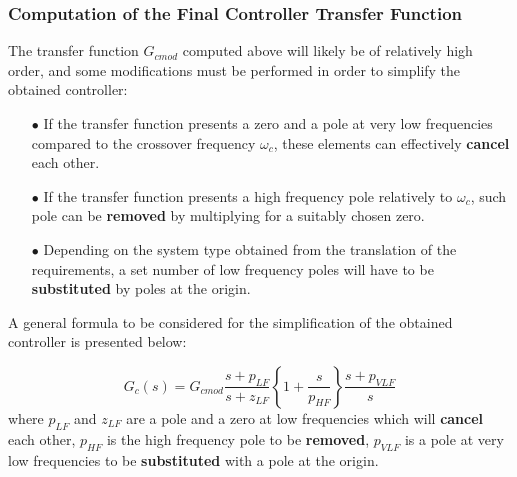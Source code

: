 \documentclass[a4paper,10pt,titlepage]{article}
\numberwithin{equation}{subsection}
\begin{document}
	\subsubsection{Computation of the Final Controller Transfer Function}
	The transfer function $G_{cmod}$ computed above will likely be of relatively high order, and some modifications must be performed in order to simplify the obtained controller:
	
	\begin{enumerate}
		\item[$\bullet$] If the transfer function presents a zero and a pole at very low frequencies compared to the crossover frequency $\omega_c$, these elements can effectively \textbf{cancel} each other.
		\item[$\bullet$] If the transfer function presents a high frequency pole relatively to $\omega_c$, such pole can be \textbf{removed} by multiplying for a suitably chosen zero.
		\item[$\bullet$] Depending on the system type obtained from the translation of the requirements, a set number of low frequency poles will have to be \textbf{substituted} by poles at the origin.
	\end{enumerate}
	A general formula to be considered for the simplification of the obtained controller is presented below:
	
	\begin{equation}
		G_c(s) = G_{cmod} \dfrac{s+p_{LF}}{s+z_{LF}} \left\{ 1+\dfrac{s}{p_{HF}} \right\} \dfrac{s+p_{VLF}}{s} 
	\end{equation}
	where $p_{LF}$ and $z_{LF}$ are a pole and a zero at low frequencies which will \textbf{cancel} each other, $p_{HF}$ is the high frequency pole to be \textbf{removed}, $p_{VLF}$ is a pole at very low frequencies to be \textbf{substituted} with a pole at the origin.
	
		
\end{document}
